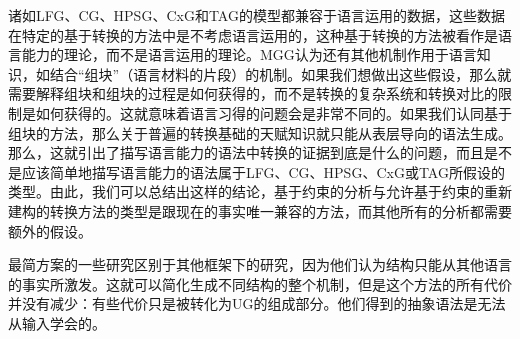 诸如LFG、CG、HPSG、CxG和TAG的模型都兼容于语言运用的数据，这些数据在特定的基于转换的方法中是不考虑语言运用的，这种基于转换的方法被看作是语言能力的理论，而不是语言运用的理论。MGG认为还有其他机制作用于语言知识，如结合“组块”（语言材料的片段）的机制。如果我们想做出这些假设，那么就需要解释组块和组块的过程是如何获得的，而不是转换的复杂系统和转换对比的限制是如何获得的。这就意味着语言习得的问题会是非常不同的。如果我们认同基于组块的方法，那么关于普遍的转换基础的天赋知识就只能从表层导向的语法生成。那么，这就引出了描写语言能力的语法中转换的证据到底是什么的问题，而且是不是应该简单地描写语言能力的语法属于LFG、CG、HPSG、CxG或TAG所假设的类型。由此，我们可以总结出这样的结论，基于约束的分析与允许基于约束的重新建构的转换方法的类型是跟现在的事实唯一兼容的方法，而其他所有的分析都需要额外的假设。

最简方案的一些研究区别于其他框架下的研究，因为他们认为结构只能从其他语言的事实所激发。这就可以简化生成不同结构的整个机制，但是这个方法的所有代价并没有减少：有些代价只是被转化为UG的组成部分。他们得到的抽象语法是无法从输入学会的。


